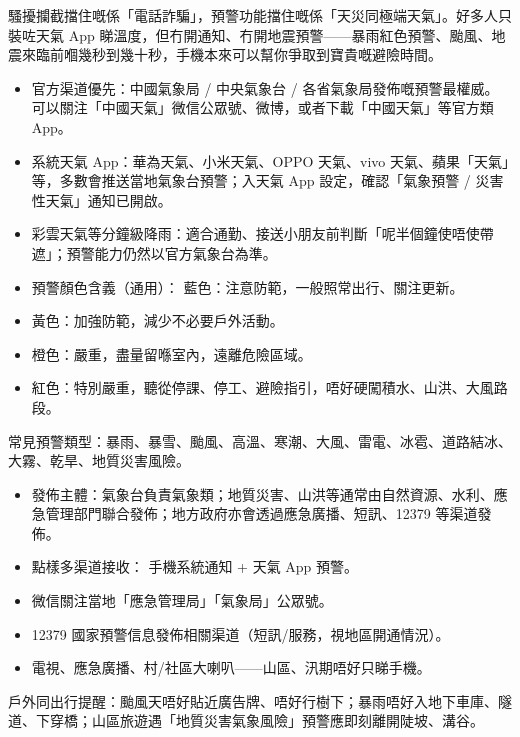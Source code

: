 
騷擾攔截擋住嘅係「電話詐騙」，預警功能擋住嘅係「天災同極端天氣」。好多人只裝咗天氣 App 睇溫度，但冇開通知、冇開地震預警——暴雨紅色預警、颱風、地震來臨前嗰幾秒到幾十秒，手機本來可以幫你爭取到寶貴嘅避險時間。


\begin{itemize}
  \item 官方渠道優先：中國氣象局 / 中央氣象台 / 各省氣象局發佈嘅預警最權威。可以關注「中國天氣」微信公眾號、微博，或者下載「中國天氣」等官方類 App。
  \item 系統天氣 App：華為天氣、小米天氣、OPPO 天氣、vivo 天氣、蘋果「天氣」等，多數會推送當地氣象台預警；入天氣 App 設定，確認「氣象預警 / 災害性天氣」通知已開啟。
  \item 彩雲天氣等分鐘級降雨：適合通勤、接送小朋友前判斷「呢半個鐘使唔使帶遮」；預警能力仍然以官方氣象台為準。
  \item 預警顏色含義（通用）： 藍色：注意防範，一般照常出行、關注更新。
  \item 黃色：加強防範，減少不必要戶外活動。
  \item 橙色：嚴重，盡量留喺室內，遠離危險區域。
  \item 紅色：特別嚴重，聽從停課、停工、避險指引，唔好硬闖積水、山洪、大風路段。
\end{itemize}

常見預警類型：暴雨、暴雪、颱風、高溫、寒潮、大風、雷電、冰雹、道路結冰、大霧、乾旱、地質災害風險。


\begin{itemize}
  \item 發佈主體：氣象台負責氣象類；地質災害、山洪等通常由自然資源、水利、應急管理部門聯合發佈；地方政府亦會透過應急廣播、短訊、12379 等渠道發佈。
  \item 點樣多渠道接收： 手機系統通知 + 天氣 App 預警。
  \item 微信關注當地「應急管理局」「氣象局」公眾號。
  \item 12379 國家預警信息發佈相關渠道（短訊/服務，視地區開通情況）。
  \item 電視、應急廣播、村/社區大喇叭——山區、汛期唔好只睇手機。
\end{itemize}

戶外同出行提醒：颱風天唔好貼近廣告牌、唔好行樹下；暴雨唔好入地下車庫、隧道、下穿橋；山區旅遊遇「地質災害氣象風險」預警應即刻離開陡坡、溝谷。

